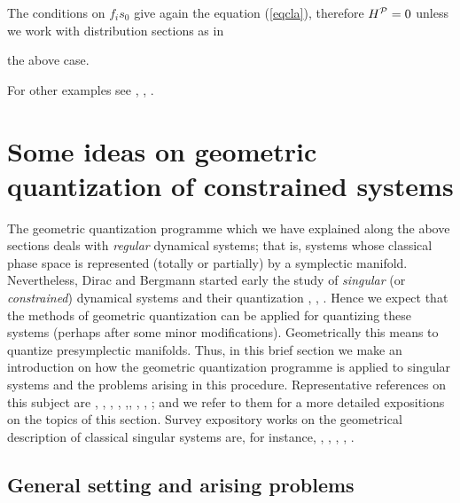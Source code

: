 \documentclass[12pt]{article}
\theoremstyle{plain}
\begin{document}
The conditions on $f_is_0$ give again the equation (\ref{eqcla}),
therefore $H^{\cal P}=0$ unless we work with distribution sections as in

the above case.

For other examples see \cite{Sn-80}, \cite{Tu-85}, \cite{Wo-80}.




\section{Some ideas on geometric quantization of constrained systems}


The geometric quantization programme  which we have explained along the
above sections
deals with {\it regular} dynamical systems; that is,
systems whose classical phase space is represented
(totally or partially) by a symplectic manifold.
Nevertheless, Dirac and Bergmann started early the study of
{\it singular} (or {\it constrained}) dynamical systems
and their quantization \cite{BG-tps}, \cite{Di-rmp}, \cite{Di-lqm}.
Hence we expect that the methods of geometric quantization can
be applied for quantizing these systems (perhaps after some minor
modifications).
Geometrically this means to quantize presymplectic manifolds.
Thus, in this brief section we make an introduction on how
the geometric quantization programme is applied
to singular systems and the problems arising in this procedure.
Representative references on this subject are
\cite{AS-86}, \cite{Blau-88a}, \cite{Blau-88b}, \cite{Go-86},
\cite{GS-81},\cite{Lo-90}, \cite{Ml-89}, \cite{Sn-83}, \cite{Tu-91};
and we refer to them for a more detailed expositions on the topics of
this section.
Survey expository works on the geometrical description of classical
singular systems are, for instance,
\cite{BK-ymtcs}, \cite{Ca-tsl}, \cite{GNH-pca}, \cite{GP-ggf},
\cite{MR-gs}.



\subsection{General setting and arising problems}
\end{document}
